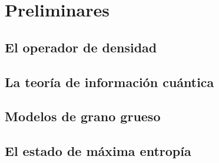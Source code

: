 \chapter{Preliminares}


\section{El operador de densidad}
\section{La teoría de información cuántica}
\section{Modelos de grano grueso}
\section{El estado de máxima entropía}

